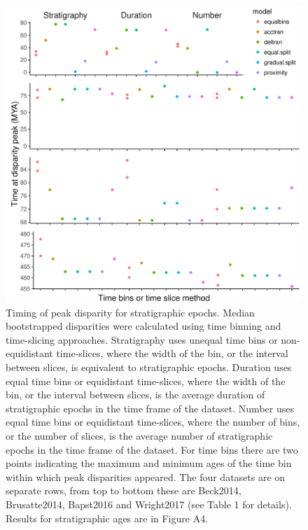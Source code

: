 \documentclass[12pt,a4paper]{article}
\begin{document}
   
  \label{table:wilcox2}  

\begin{figure}[!htbp]
    \centering
    \includegraphics[width=1\linewidth, height=1\textheight, keepaspectratio]{figures/fig-peaks-epoch-appendix.pdf}
    \caption[Timing of peak disparity for four example datasets.]
    {Timing of peak disparity for stratigraphic epochs.
    Median bootstrapped disparities were calculated using time binning and time-slicing approaches. 
    Stratigraphy uses unequal time bins or non-equidistant time-slices, where the width of the bin, or the interval between slices, is equivalent to stratigraphic epochs. 
    Duration uses equal time bins or equidistant time-slices, where the width of the bin, or the interval between slices, is the average duration of stratigraphic epochs in the time frame of the dataset. 
    Number uses equal time bins or equidistant time-slices, where the number of bins, or the number of slices, is the average number of stratigraphic epochs in the time frame of the dataset. 
    For time bins there are two points indicating the maximum and minimum ages of the time bin within which peak disparities appeared.
    The four datasets are on separate rows, from top to bottom these are Beck2014, Brusatte2014, Bapst2016 and Wright2017 (see Table 1 for details).
    Results for stratigraphic ages are in Figure A4.}
    \label{figure:peak2}
  \end{figure}
\end{document}
